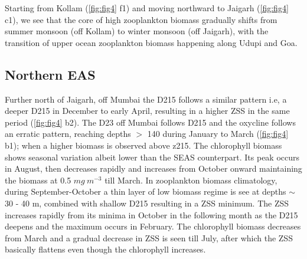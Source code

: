 \documentclass{article}
\begin{document}
	Starting from Kollam (\cref{fig:fig4} f1) and moving northward to Jaigarh (\cref{fig:fig4} c1), we see that the core of high zooplankton biomass gradually shifts from summer monsoon (off Kollam) to winter monsoon (off Jaigarh), with the transition of upper ocean zooplankton biomass happening along Udupi and Goa. 
	 
	\subsection{Northern EAS}
	Further north of Jaigarh, off Mumbai the D215 follows a similar pattern i.e, a deeper D215 in December to early April, resulting in a higher ZSS in the same period (\cref{fig:fig4} b2). The D23 off Mumbai follows D215 and the oxycline follows an erratic pattern, reaching depths $>$ 140 during January to March (\cref{fig:fig4} b1); when a higher biomass is observed above z215. The chlorophyll biomass shows seasonal variation albeit lower than the SEAS counterpart. Its peak occurs in August, then decreases rapidly and increases from October onward maintaining the biomass at 0.5 $mg\ m^{-3}$ till March. In zooplankton biomass climatology, during September-October a thin layer of low biomass regime is see at depths $\sim$30 - 40 m, combined with shallow D215 resulting in a ZSS minimum. The ZSS increases rapidly from its minima in October in the following month as the D215 deepens and the maximum occurs in February. The chlorophyll biomass decreases from March and a gradual decrease in ZSS is seen till July, after which the ZSS basically flattens even though the chlorophyll increases. 
	
	 
\end{document}
